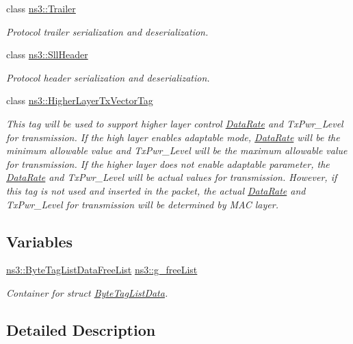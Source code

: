 \begin{DoxyCompactItemize}
class \hyperlink{classns3_1_1Trailer}{ns3\+::\+Trailer}
\begin{DoxyCompactList}\small\item\em Protocol trailer serialization and deserialization. \end{DoxyCompactList}\item 
class \hyperlink{classns3_1_1SllHeader}{ns3\+::\+Sll\+Header}
\begin{DoxyCompactList}\small\item\em Protocol header serialization and deserialization. \end{DoxyCompactList}\item 
class \hyperlink{classns3_1_1HigherLayerTxVectorTag}{ns3\+::\+Higher\+Layer\+Tx\+Vector\+Tag}
\begin{DoxyCompactList}\small\item\em This tag will be used to support higher layer control \hyperlink{classns3_1_1DataRate}{Data\+Rate} and Tx\+Pwr\+\_\+\+Level for transmission. If the high layer enables adaptable mode, \hyperlink{classns3_1_1DataRate}{Data\+Rate} will be the minimum allowable value and Tx\+Pwr\+\_\+\+Level will be the maximum allowable value for transmission. If the higher layer does not enable adaptable parameter, the \hyperlink{classns3_1_1DataRate}{Data\+Rate} and Tx\+Pwr\+\_\+\+Level will be actual values for transmission. However, if this tag is not used and inserted in the packet, the actual \hyperlink{classns3_1_1DataRate}{Data\+Rate} and Tx\+Pwr\+\_\+\+Level for transmission will be determined by M\+AC layer. \end{DoxyCompactList}\end{DoxyCompactItemize}
\subsection*{Variables}
\begin{DoxyCompactItemize}
\item 
\hyperlink{classns3_1_1ByteTagListDataFreeList}{ns3\+::\+Byte\+Tag\+List\+Data\+Free\+List} \hyperlink{group__packet_gaed1170b07d22fd956e755d86bf5e5f08}{ns3\+::g\+\_\+free\+List}
\begin{DoxyCompactList}\small\item\em Container for struct \hyperlink{structns3_1_1ByteTagListData}{Byte\+Tag\+List\+Data}. \end{DoxyCompactList}\end{DoxyCompactItemize}


\subsection{Detailed Description}


